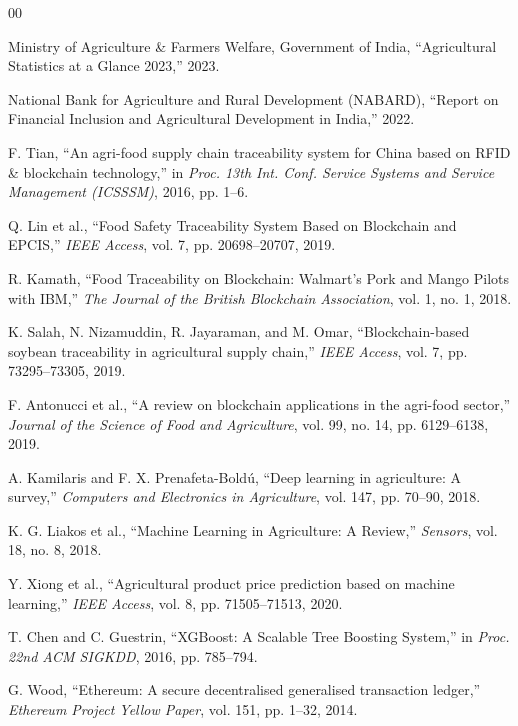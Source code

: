 \documentclass[conference]{IEEEtran}
\begin{document}
\begin{thebibliography}{00}

 Ministry of Agriculture \& Farmers Welfare, Government of India, ``Agricultural Statistics at a Glance 2023,'' 2023.

 National Bank for Agriculture and Rural Development (NABARD), ``Report on Financial Inclusion and Agricultural Development in India,'' 2022.

 F. Tian, ``An agri-food supply chain traceability system for China based on RFID \& blockchain technology,'' in \textit{Proc. 13th Int. Conf. Service Systems and Service Management (ICSSSM)}, 2016, pp. 1--6.

 Q. Lin et al., ``Food Safety Traceability System Based on Blockchain and EPCIS,'' \textit{IEEE Access}, vol. 7, pp. 20698--20707, 2019.

 R. Kamath, ``Food Traceability on Blockchain: Walmart's Pork and Mango Pilots with IBM,'' \textit{The Journal of the British Blockchain Association}, vol. 1, no. 1, 2018.

 K. Salah, N. Nizamuddin, R. Jayaraman, and M. Omar, ``Blockchain-based soybean traceability in agricultural supply chain,'' \textit{IEEE Access}, vol. 7, pp. 73295--73305, 2019.

 F. Antonucci et al., ``A review on blockchain applications in the agri-food sector,'' \textit{Journal of the Science of Food and Agriculture}, vol. 99, no. 14, pp. 6129--6138, 2019.

 A. Kamilaris and F. X. Prenafeta-Bold\'u, ``Deep learning in agriculture: A survey,'' \textit{Computers and Electronics in Agriculture}, vol. 147, pp. 70--90, 2018.

 K. G. Liakos et al., ``Machine Learning in Agriculture: A Review,'' \textit{Sensors}, vol. 18, no. 8, 2018.

 Y. Xiong et al., ``Agricultural product price prediction based on machine learning,'' \textit{IEEE Access}, vol. 8, pp. 71505--71513, 2020.

 T. Chen and C. Guestrin, ``XGBoost: A Scalable Tree Boosting System,'' in \textit{Proc. 22nd ACM SIGKDD}, 2016, pp. 785--794.

 G. Wood, ``Ethereum: A secure decentralised generalised transaction ledger,'' \textit{Ethereum Project Yellow Paper}, vol. 151, pp. 1--32, 2014.


\end{thebibliography}
\end{document}
